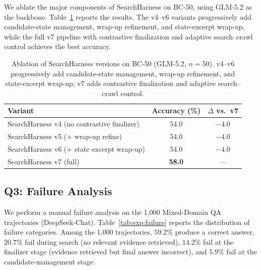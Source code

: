 We ablate the major components of SearchHarness on BC-50, using GLM-5.2 as the backbone.
Table~\ref{tab:exp:ablation} reports the results.
The v4--v6 variants progressively add candidate-state management, wrap-up refinement, and state-excerpt wrap-up, while the full v7 pipeline with contrastive finalization and adaptive search--crawl control achieves the best accuracy.

\begin{table}[t]
  \centering
  \small
  \begin{tabular}{lcc}
    \toprule
    Variant & Accuracy (\%) & $\Delta$ vs.\ v7 \\
    \midrule
    SearchHarness v4 (no contrastive finalizer) & 54.0 & $-4.0$ \\
    SearchHarness v5 (+ wrap-up refine)          & 54.0 & $-4.0$ \\
    SearchHarness v6 (+ state excerpt wrap-up)   & 54.0 & $-4.0$ \\
    SearchHarness v7 (full)                      & \textbf{58.0} & --- \\
    \bottomrule
  \end{tabular}
  \caption{Ablation of SearchHarness versions on BC-50 (GLM-5.2, $n=50$). v4--v6 progressively add candidate-state management, wrap-up refinement, and state-excerpt wrap-up; v7 adds contrastive finalization and adaptive search--crawl control.}
  \label{tab:exp:ablation}
\end{table}

\subsection{Q3: Failure Analysis}
\label{sec:exp:failure}

We perform a manual failure analysis on the 1{,}000 Mixed-Domain QA trajectories (DeepSeek-Chat).
Table~\ref{tab:exp:failure} reports the distribution of failure categories.
Among the 1{,}000 trajectories, $59.2\%$ produce a correct answer, $20.7\%$ fail during search (no relevant evidence retrieved), $14.2\%$ fail at the finalizer stage (evidence retrieved but final answer incorrect), and $5.9\%$ fail at the candidate-management stage.

